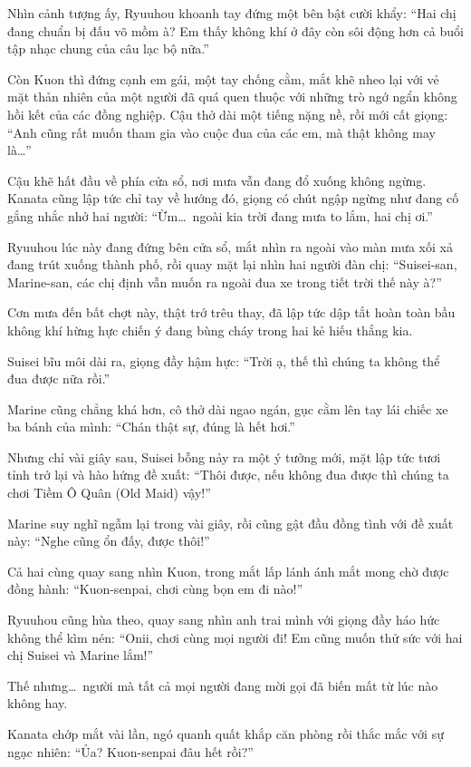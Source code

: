 \documentclass[../main.tex]{subfiles}
\begin{document}
Nhìn cảnh tượng ấy, Ryuuhou khoanh tay đứng một bên bật cười khẩy: ``Hai chị đang chuẩn bị đấu võ mồm à? Em thấy không khí ở đây còn sôi động hơn cả buổi tập nhạc chung của câu lạc bộ nữa.''

Còn Kuon thì đứng cạnh em gái, một tay chống cằm, mắt khẽ nheo lại với vẻ mặt thản nhiên của một người đã quá quen thuộc với những trò ngớ ngẩn không hồi kết của các đồng nghiệp. Cậu thở dài một tiếng nặng nề, rồi mới cất giọng: ``Anh cũng rất muốn tham gia vào cuộc đua của các em, mà thật không may là\dots''

Cậu khẽ hất đầu về phía cửa sổ, nơi mưa vẫn đang đổ xuống không ngừng. Kanata cũng lập tức chỉ tay về hướng đó, giọng có chút ngập ngừng như đang cố gắng nhắc nhở hai người: ``Ừm\dots\ ngoài kia trời đang mưa to lắm, hai chị ơi.''

Ryuuhou lúc này đang đứng bên cửa sổ, mắt nhìn ra ngoài vào màn mưa xối xả đang trút xuống thành phố, rồi quay mặt lại nhìn hai người đàn chị: ``Suisei-san, Marine-san, các chị định vẫn muốn ra ngoài đua xe trong tiết trời thế này à?''

Cơn mưa đến bất chợt này, thật trớ trêu thay, đã lập tức dập tắt hoàn toàn bầu không khí hừng hực chiến ý đang bùng cháy trong hai kẻ hiếu thắng kia.

Suisei bĩu môi dài ra, giọng đầy hậm hực: ``Trời ạ, thế thì chúng ta không thể đua được nữa rồi.''

Marine cũng chẳng khá hơn, cô thở dài ngao ngán, gục cằm lên tay lái chiếc xe ba bánh của mình: ``Chán thật sự, đúng là hết hơi.''

Nhưng chỉ vài giây sau, Suisei bỗng nảy ra một ý tưởng mới, mặt lập tức tươi tỉnh trở lại và hào hứng đề xuất: ``Thôi được, nếu không đua được thì chúng ta chơi Tiềm Ô Quân (Old Maid) vậy!''

Marine suy nghĩ ngẫm lại trong vài giây, rồi cũng gật đầu đồng tình với đề xuất này: ``Nghe cũng ổn đấy, được thôi!''

Cả hai cùng quay sang nhìn Kuon, trong mắt lấp lánh ánh mắt mong chờ được đồng hành: ``Kuon-senpai, chơi cùng bọn em đi nào!''

Ryuuhou cũng hùa theo, quay sang nhìn anh trai mình với giọng đầy háo hức không thể kìm nén: ``Onii, chơi cùng mọi người đi! Em cũng muốn thử sức với hai chị Suisei và Marine lắm!''

Thế nhưng\dots\ người mà tất cả mọi người đang mời gọi đã biến mất từ lúc nào không hay.

Kanata chớp mắt vài lần, ngó quanh quất khắp căn phòng rồi thắc mắc với sự ngạc nhiên: ``Ủa? Kuon-senpai đâu hết rồi?''
\end{document}
